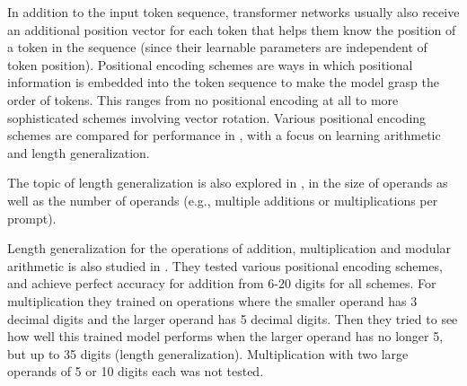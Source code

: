 In addition to the input token sequence, transformer networks usually also receive an additional position vector for each token that helps them know the position of a token in the sequence (since their learnable parameters are independent of token position).
Positional encoding schemes are ways in which positional information is embedded into the token sequence to make the model grasp the order of tokens. This ranges from no positional encoding at all to more sophisticated schemes involving vector rotation.
Various positional encoding schemes are compared for performance in  \cite{positionmatters}, with a focus on learning arithmetic and length generalization. 

The topic of length generalization is also explored in \cite{lengthandcount},  in the size of operands as well as the number of operands (e.g., multiple additions or multiplications per prompt).

Length generalization for the operations of addition, multiplication and modular arithmetic is also studied in \cite{lengthgen}. They tested various positional encoding schemes, and achieve perfect accuracy for addition from 6-20 digits for all schemes. For multiplication they trained on operations where the smaller operand has 3 decimal digits and the larger operand has 5 decimal digits. Then they tried to see how well this trained model performs when the larger operand has no longer 5, but up to 35 digits (length generalization). Multiplication with two large operands of 5 or 10 digits each was not tested.